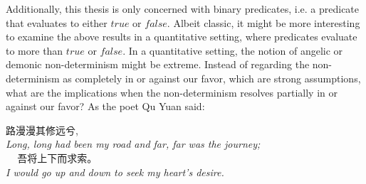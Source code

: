 Additionally, this thesis is only concerned with binary predicates, i.e. a predicate that evaluates to either $true$ or $false$. 
Albeit classic, it might be more interesting to examine the above results in a quantitative setting, where predicates evaluate to more than $true$ or $false$. 
In a quantitative setting, the notion of angelic or demonic non-determinism might be extreme. 
Instead of regarding the non-determinism as completely in or against our favor, which are strong assumptions, what are the implications when the non-determinism resolves partially in or against our favor? 
As the poet Qu Yuan said: 
\begin{center}
    路漫漫其修远兮,\\
    \textit{Long, long had been my road and far, far was the journey;} \\ 
    \ \ \,吾将上下而求索。\\
    \textit{I would go up and down to seek my heart’s desire.}~\cite{hawkes2012}
\end{center}




